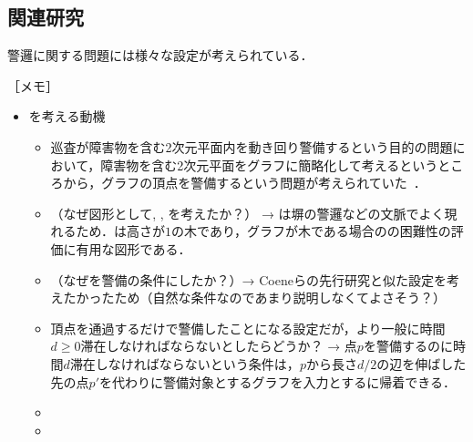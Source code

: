 \subsection*{関連研究}
警邏に関する問題には様々な設定が考えられている．

［メモ］
\begin{itemize}
  \item {\patProb}を考える動機
  \begin{itemize}
    \item 巡査が障害物を含む2次元平面内を動き回り警備するという目的の問題において，障害物を含む2次元平面をグラフに簡略化して考えるというところから，グラフの頂点を警備するという問題が考えられていた~\cite{machado2002multi}．
    \item （なぜ図形として{\graphLine}, {\graphStar}, {\graphUnit}を考えたか？） → {\graphLine}は塀の警邏などの文脈でよく現れるため．{\graphStar}は高さが$1$の木であり，グラフが木である場合の{\patProb}の困難性の評価に有用な図形である．
    \item （なぜ{\maxIdletime}を警備の条件にしたか？）→ Coeneらの先行研究と似た設定を考えたかったため（自然な条件なのであまり説明しなくてよさそう？）
    \item 頂点を通過するだけで警備したことになる設定だが，より一般に時間$d \geq 0$滞在しなければならないとしたらどうか？ → 点$p$を警備するのに時間$d$滞在しなければならないという条件は，$p$から長さ$d/2$の辺を伸ばした先の点$p'$を代わりに警備対象とするグラフを入力とする{\patProb}に帰着できる．
    \item 
    \item 
  \end{itemize}


\end{itemize}

